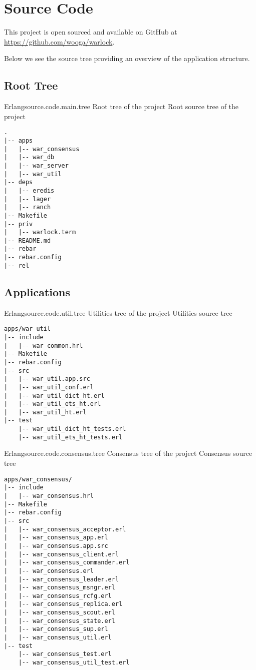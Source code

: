 ﻿\chapter{Source Code}
\label{appendix:source.code}

This project is open sourced and available on GitHub at
\url{https://github.com/wooga/warlock}.

Below we see the source tree providing
an overview of the application structure.

\section{Root Tree}

\begin{scode}{Erlang}{source.code.main.tree}{%
  Root tree of the project}{%
  Root source tree of the project}
  \begin{lstlisting}
.
|-- apps
|   |-- war_consensus
|   |-- war_db
|   |-- war_server
|   |-- war_util
|-- deps
|   |-- eredis
|   |-- lager
|   |-- ranch
|-- Makefile
|-- priv
|   |-- warlock.term
|-- README.md
|-- rebar
|-- rebar.config
|-- rel

  \end{lstlisting}
\end{scode}

\section{Applications}

\begin{scode}{Erlang}{source.code.util.tree}{%
  Utilities tree of the project}{%
  Utilities source tree}
  \begin{lstlisting}
apps/war_util
|-- include
|   |-- war_common.hrl
|-- Makefile
|-- rebar.config
|-- src
|   |-- war_util.app.src
|   |-- war_util_conf.erl
|   |-- war_util_dict_ht.erl
|   |-- war_util_ets_ht.erl
|   |-- war_util_ht.erl
|-- test
    |-- war_util_dict_ht_tests.erl
    |-- war_util_ets_ht_tests.erl

  \end{lstlisting}
\end{scode}

\begin{scode}{Erlang}{source.code.consensus.tree}{%
  Consensus tree of the project}{%
  Consensus source tree}
  \begin{lstlisting}
apps/war_consensus/
|-- include
|   |-- war_consensus.hrl
|-- Makefile
|-- rebar.config
|-- src
|   |-- war_consensus_acceptor.erl
|   |-- war_consensus_app.erl
|   |-- war_consensus.app.src
|   |-- war_consensus_client.erl
|   |-- war_consensus_commander.erl
|   |-- war_consensus.erl
|   |-- war_consensus_leader.erl
|   |-- war_consensus_msngr.erl
|   |-- war_consensus_rcfg.erl
|   |-- war_consensus_replica.erl
|   |-- war_consensus_scout.erl
|   |-- war_consensus_state.erl
|   |-- war_consensus_sup.erl
|   |-- war_consensus_util.erl
|-- test
    |-- war_consensus_test.erl
    |-- war_consensus_util_test.erl
  \end{lstlisting}
\end{scode}

